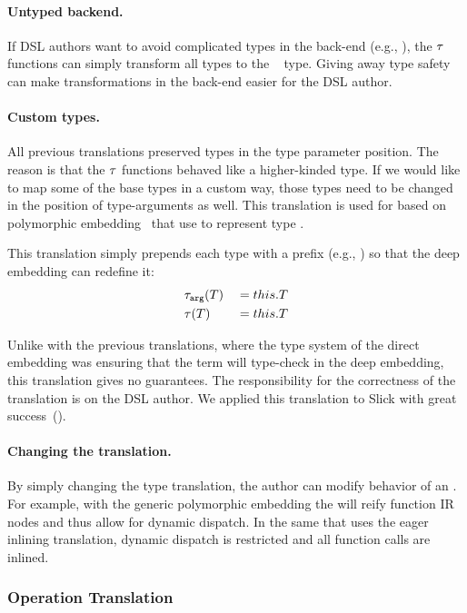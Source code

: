 \paragraph{Untyped backend.} If DSL authors want to avoid complicated types in the back-end (e.g., ), the $\tau$ functions can simply transform all types to the ~\cite{abadi_dynamic_1991} type. Giving away type safety can make transformations in the back-end easier for the DSL author.

\paragraph{Custom types.} All previous translations preserved types in the type parameter position. The reason is that the $\tau$ functions behaved like a higher-kinded type. If we would like to map some of the base types in a custom way, those types need to be changed in the position of type-arguments as well. This translation is used for \edsls based on polymorphic embedding~\cite{hofer_polymorphic_2008} that use  to represent type .

This translation simply prepends each type with a prefix (e.g., ) so that
the deep embedding can redefine it:
\begin{alignat*}{3}
&\ttarg[T] & \; = \; & this.T\\
&\ttother[T] & \; = \; & this.T\\
\end{alignat*}

Unlike with the previous translations, where the type system of the direct embedding was
ensuring that the term will type-check in the deep embedding, this translation gives no guarantees. The
responsibility for the correctness of the translation is on the DSL author. We applied this translation to Slick
\cite{slick} with great success~().

\paragraph{Changing the translation.} By simply changing the type translation, the \edsl author can modify behavior of an \edsl.  For example, with the generic polymorphic embedding the \edsl will reify function IR nodes and thus allow for dynamic dispatch. In the same \edsl that uses the eager inlining translation, dynamic dispatch is restricted and all function calls are inlined.

\subsubsection{Operation Translation}
\label{sec:operation-translation}

